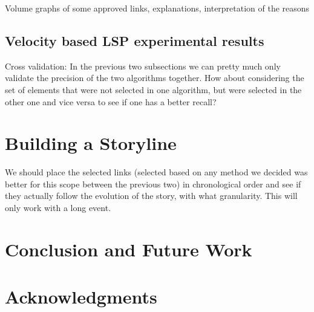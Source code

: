 \documentclass{sig-alternate}
\begin{document}
Volume graphs of some approved links, explanations, interpretation of the reasons

\subsection{Velocity based LSP experimental results}
\label{sec:velocityResults}

Cross validation: In the previous two subsections we can pretty much only validate the precision of the two algorithms together. How about considering the set of elements that were not selected in one algorithm, but were selected in the other one and vice versa to see if one has a better recall?


\section{Building a Storyline}
\label{sec:storyline}
We should place the selected links (selected based on any method we decided was better for this scope between the previous two) in chronological order and see if they actually follow the evolution of the story, with what granularity. This will only work with a long event.



\section{Conclusion and Future Work}
\label{sec:conclusions}


\section{Acknowledgments}
\label{sec:ack}

\nocite{*}


\balancecolumns
\end{document}
